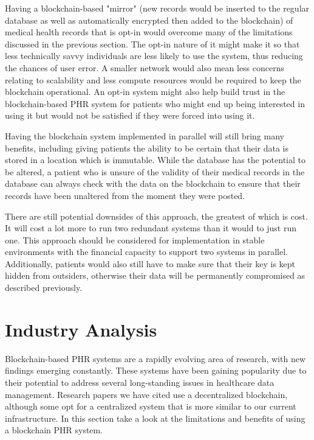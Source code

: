\documentclass{article}
\begin{document}
Having a blockchain-based "mirror" (new records would be inserted to the regular database as well as automatically encrypted then added to the blockchain) of medical health records that is opt-in would overcome many of the limitations discussed in the previous section. The opt-in nature of it might make it so that less technically savvy individuals are less likely to use the system, thus reducing the chances of user error. A smaller network would also mean less concerns relating to scalability and less compute resources would be required to keep the blockchain operational. An opt-in system might also help build trust in the blockchain-based PHR system for patients who might end up being interested in using it but would not be satisfied if they were forced into using it.

Having the blockchain system implemented in parallel will still bring many benefits, including giving patients the ability to be certain that their data is stored in a location which is immutable. While the database has the potential to be altered, a patient who is unsure of the validity of their medical records in the database can always check with the data on the blockchain to ensure that their records have been unaltered from the moment they were posted. 

There are still potential downsides of this approach, the greatest of which is cost. It will cost a lot more to run two redundant systems than it would to just run one. This approach should be considered for implementation in stable environments with the financial capacity to support two systems in parallel. Additionally, patients would also still have to make sure that their key is kept hidden from outsiders, otherwise their data will be permanently compromised as described previously.





\section{Industry Analysis}
Blockchain-based PHR systems are a rapidly evolving area of research, with new findings emerging constantly. These systems have been gaining popularity due to their potential to address several long-standing issues in healthcare data management. Research papers we have cited use a decentralized blockchain, although some opt for a centralized system that is more similar to our current infrastructure. In this section take a look at the limitations and benefits of using a blockchain PHR system. 
\end{document}
